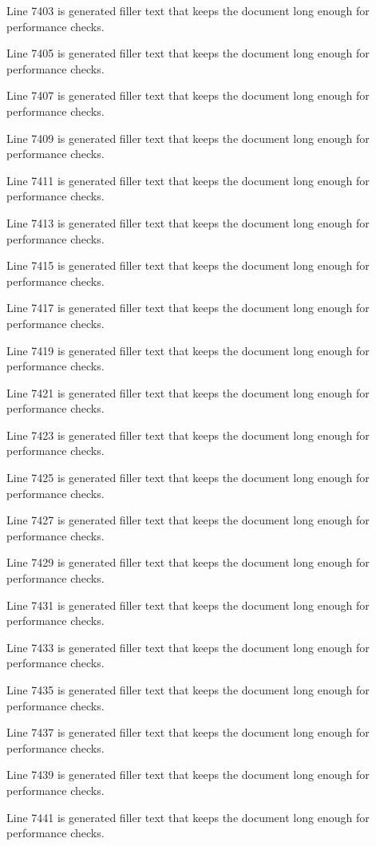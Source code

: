 Line 7403 is generated filler text that keeps the document long enough for performance checks.

Line 7405 is generated filler text that keeps the document long enough for performance checks.

Line 7407 is generated filler text that keeps the document long enough for performance checks.

Line 7409 is generated filler text that keeps the document long enough for performance checks.

Line 7411 is generated filler text that keeps the document long enough for performance checks.

Line 7413 is generated filler text that keeps the document long enough for performance checks.

Line 7415 is generated filler text that keeps the document long enough for performance checks.

Line 7417 is generated filler text that keeps the document long enough for performance checks.

Line 7419 is generated filler text that keeps the document long enough for performance checks.

Line 7421 is generated filler text that keeps the document long enough for performance checks.

Line 7423 is generated filler text that keeps the document long enough for performance checks.

Line 7425 is generated filler text that keeps the document long enough for performance checks.

Line 7427 is generated filler text that keeps the document long enough for performance checks.

Line 7429 is generated filler text that keeps the document long enough for performance checks.

Line 7431 is generated filler text that keeps the document long enough for performance checks.

Line 7433 is generated filler text that keeps the document long enough for performance checks.

Line 7435 is generated filler text that keeps the document long enough for performance checks.

Line 7437 is generated filler text that keeps the document long enough for performance checks.

Line 7439 is generated filler text that keeps the document long enough for performance checks.

Line 7441 is generated filler text that keeps the document long enough for performance checks.

